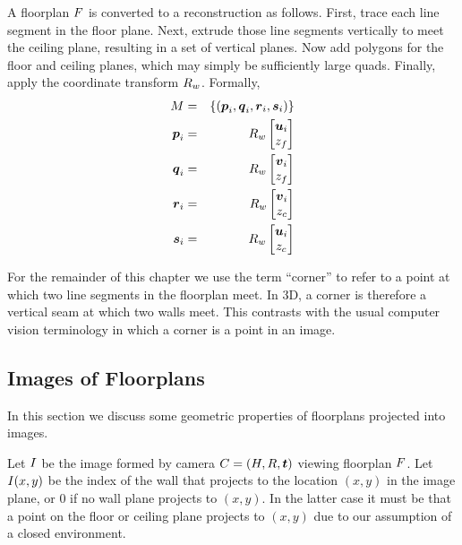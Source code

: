 A floorplan $\Floorplan$ is converted to a reconstruction as
follows. First, trace each line segment in the floor plane. Next,
extrude those line segments vertically to meet the ceiling plane,
resulting in a set of vertical planes. Now add polygons for the floor
and ceiling planes, which may simply be sufficiently large
quads. Finally, apply the coordinate transform $\SceneR$. Formally,
\begin{eqnarray}
  \Reconstruction &=& 
  \{ ( \vect{p}_i, \vect{q}_i, \vect{r}_i, \vect{s}_i ) \} \\
  \vect{p}_i &=& \SceneR \begin{bmatrix} \startpt_i \\ \zfloor \end{bmatrix} \\
  \vect{q}_i &=& \SceneR \begin{bmatrix} \enpt_i \\ \zfloor \end{bmatrix} \\
  \vect{r}_i &=& \SceneR \begin{bmatrix} \enpt_i \\ \zceil \end{bmatrix} \\
  \vect{s}_i &=& \SceneR \begin{bmatrix} \startpt_i \\ \zceil \end{bmatrix}
\end{eqnarray}

For the remainder of this chapter we use the term ``corner'' to refer
to a point at which two line segments in the floorplan meet. In 3D, a
corner is therefore a vertical seam at which two walls meet. This
contrasts with the usual computer vision terminology in which a corner
is a point in an image.

\subsection{Images of Floorplans}

In this section we discuss some geometric properties of floorplans
projected into images. 

Let $\Image$ be the image formed by camera
$\Camera=(\CamMatrix,\CamR,\CamTr)$ viewing floorplan
$\Floorplan$. Let $\Image(x,y)$ be the index of the wall that projects
to the location $(x,y)$ in the image plane, or 0 if no wall plane
projects to $(x,y)$. In the latter case it must be that a point on the
floor or ceiling plane projects to $(x,y)$ due to our assumption of a
closed environment.

